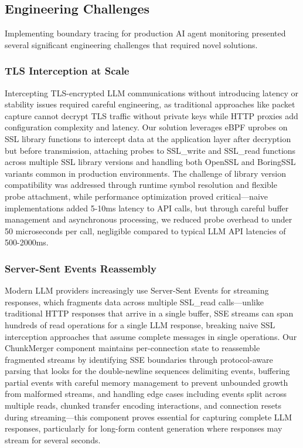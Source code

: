 \subsection{Engineering Challenges}

Implementing boundary tracing for production AI agent monitoring presented several significant engineering challenges that required novel solutions.

\subsubsection{TLS Interception at Scale}

Intercepting TLS-encrypted LLM communications without introducing latency or stability issues required careful engineering, as traditional approaches like packet capture cannot decrypt TLS traffic without private keys while HTTP proxies add configuration complexity and latency. Our solution leverages eBPF uprobes on SSL library functions to intercept data at the application layer after decryption but before transmission, attaching probes to SSL\_write and SSL\_read functions across multiple SSL library versions and handling both OpenSSL and BoringSSL variants common in production environments. The challenge of library version compatibility was addressed through runtime symbol resolution and flexible probe attachment, while performance optimization proved critical—naive implementations added 5-10ms latency to API calls, but through careful buffer management and asynchronous processing, we reduced probe overhead to under 50 microseconds per call, negligible compared to typical LLM API latencies of 500-2000ms.

\subsubsection{Server-Sent Events Reassembly}

Modern LLM providers increasingly use Server-Sent Events for streaming responses, which fragments data across multiple SSL\_read calls—unlike traditional HTTP responses that arrive in a single buffer, SSE streams can span hundreds of read operations for a single LLM response, breaking naive SSL interception approaches that assume complete messages in single operations. Our ChunkMerger component maintains per-connection state to reassemble fragmented streams by identifying SSE boundaries through protocol-aware parsing that looks for the double-newline sequences delimiting events, buffering partial events with careful memory management to prevent unbounded growth from malformed streams, and handling edge cases including events split across multiple reads, chunked transfer encoding interactions, and connection resets during streaming—this component proves essential for capturing complete LLM responses, particularly for long-form content generation where responses may stream for several seconds.

